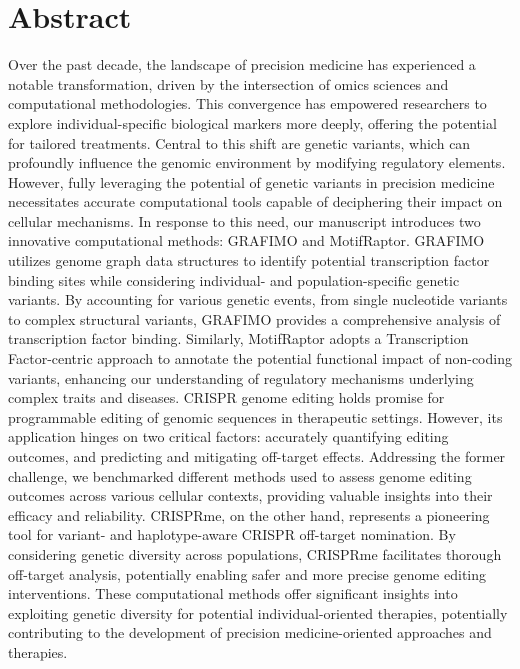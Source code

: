 \documentclass[a4paper, titlepage, openright]{book}
\newcommand{\mychapter}[2]{
    \setcounter{chapter}{#1}
    \setcounter{section}{0}
    \chapter*{#2}
    \addcontentsline{toc}{chapter}{#2}
}
\newcommand{\grafimo}{GRAFIMO\xspace}
\newcommand{\crisprme}{CRISPRme\xspace}
\newcommand{\motifraptor}{MotifRaptor\xspace}
\begin{document}
\begin{frontespizio}
\end{frontespizio}
\tableofcontents
\listoffigures
\listoftables


\mychapter{0}{Abstract}
Over the past decade, the landscape of precision medicine has experienced a notable transformation, driven by the intersection of omics sciences and computational methodologies. This convergence has empowered researchers to explore individual-specific biological markers more deeply, offering the potential for tailored treatments. Central to this shift are genetic variants, which can profoundly influence the genomic environment by modifying regulatory elements. However, fully leveraging the potential of genetic variants in precision medicine necessitates accurate computational tools capable of deciphering their impact on cellular mechanisms. In response to this need, our manuscript introduces two innovative computational methods: \grafimo and \motifraptor. \grafimo utilizes genome graph data structures to identify potential transcription factor binding sites while considering individual- and population-specific genetic variants. By accounting for various genetic events, from single nucleotide variants to complex structural variants, \grafimo provides a comprehensive analysis of transcription factor binding. Similarly, \motifraptor adopts a Transcription Factor-centric approach to annotate the potential functional impact of non-coding variants, enhancing our understanding of regulatory mechanisms underlying complex traits and diseases. CRISPR genome editing holds promise for programmable editing of genomic sequences in therapeutic settings. However, its application hinges on two critical factors: accurately quantifying editing outcomes, and predicting and mitigating off-target effects. Addressing the former challenge, we benchmarked different methods used to assess genome editing outcomes across various cellular contexts, providing valuable insights into their efficacy and reliability. \crisprme, on the other hand, represents a pioneering tool for variant- and haplotype-aware CRISPR off-target nomination. By considering genetic diversity across populations, \crisprme facilitates thorough off-target analysis, potentially enabling safer and more precise genome editing interventions. These computational methods offer significant insights into exploiting genetic diversity for potential individual-oriented therapies, potentially contributing to the development of precision medicine-oriented approaches and therapies.
\end{document}
